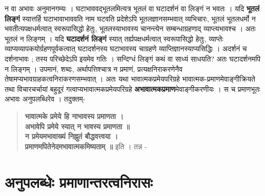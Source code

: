 न वा अभावः अनुमानगम्यः । घटाभाववद्भूतलमित्यत्र भूतलं वा घटादर्शनं वा लिङ्गं न भवतः । यदि \textbf{भूतलं लिङ्गं} स्यात्तर्हि घटाभावाभाववति नाम घटवति प्रदेशेऽपि भूतलज्ञानसम्भवात् व्यभिचारः, भूतलं भूतलधर्मो न भवतीत्यपक्षधर्मत्वात् स्वरूपासिद्धो हेतुः, भूतलस्याभावस्य चानन्त्येन सम्बन्धाग्रहणाद् व्याप्त्यभावश्च । अतः भूतलं न लिङ्गम् ।  यदि \textbf{घटादर्शनं लिङ्गं} स्यात् तर्ह्यपक्षधर्मत्वात् स्वरूपासिद्धो हेतुः, व्याप्तेः व्याप्यव्यापकयोर्ग्रहणपूर्वकत्वात् घटादर्शनस्य घटाभावस्य चाग्रहणे व्याप्तिज्ञानस्याप्यसिद्धिः । अदर्शनं च दर्शनाभावः ; तस्य परिच्छेदेऽपि इयमेव गतिः । सन्दिग्धं लिङ्गं कथं वा साध्यं साधयति? अतः घटादर्शनमपि न लिङ्गम् । उपमानं, शब्दः, अर्थापत्तिश्चात्र न प्रमाणं, प्रत्यक्षनिराकरणेनैव तेषामप्यभावग्राहकत्वनिराकरणसम्भवात् । अतः यथा भावात्मकप्रमेयपरिग्रहे भावात्मक-प्रमाणमेवाङ्गीक्रियते तथा विचारचर्चायां बहुदूरं गत्वाप्यभावात्मकप्रमेयपरिग्रहे \textbf{अभावात्मकप्रमाण}मेवाङ्गीकरणीयः । स च प्रमाणभूतः अभावः अनुपलब्धिरेव । तदुक्तम्-
\begin{verse}
\textbf{भावात्मके प्रमेये हि नाभावस्य प्रमाणता ।\\
अभावेपि प्रमेये स्यात् न भावस्य प्रमाणता ॥\\
न प्रमेयमभावाख्यं निह्नुतं बौद्धवत्त्वया ।\\
प्रमाणमपितेनेदमभावात्मकमिष्यताम् ॥} इति । तन्न -
\end{verse}

\section*{अनुपलब्धेः प्रमाणान्तरत्वनिरासः} 

